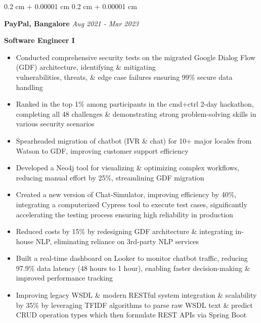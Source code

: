 \documentclass[10pt, letterpaper]{article}
\newenvironment{highlights}{
    \begin{itemize}[
        topsep=0.10 cm,
        parsep=0.10 cm,
        partopsep=0pt,
        itemsep=0pt,
        leftmargin=0.4 cm
    ]
}{
    \end{itemize}
} %
\newenvironment{onecolentry}{
    \begin{adjustwidth}{
        0.2 cm + 0.00001 cm
    }{
        0.2 cm + 0.00001 cm
    }
}{
    \end{adjustwidth}
} %
\begin{document}
        \vspace{0.2 cm}

        
        \begin{onecolentry}
        \fontsize{11 pt}{11 pt}
        \textbf{PayPal, Bangalore} \hfill \textit{Aug 2021 - Mar 2023}

            \fontsize{11 pt}{11 pt}
            \textbf{Software Engineer I}
            \begin{highlights}
                \item	Conducted comprehensive security tests on the migrated Google Dialog Flow (GDF) architecture, identifying \& mitigating \\ vulnerabilities, threats, \& edge case failures ensuring 99\% secure data handling
                
                \item	Ranked in the top 1\% among participants in the cmd+ctrl 2-day hackathon, completing all 48 challenges \& demonstrating strong problem-solving skills in various security scenarios
                
                \item	Spearheaded migration of chatbot (IVR \& chat) for 10+ major locales from Watson to GDF, improving customer support efficiency
                
                \item	Developed a Neo4j tool for visualizing \& optimizing complex workflows, reducing manual effort by 25\%, streamlining GDF migration
                
                \item	Created a new version of Chat-Simulator, improving efficiency by 40\%, integrating a computerized Cypress tool to execute test cases, significantly accelerating the testing process ensuring high reliability in production
                
                \item	Reduced costs by 15\% by redesigning GDF architecture \& integrating in-house NLP, eliminating reliance on 3rd-party NLP services
                
                \item	Built a real-time dashboard on Looker to monitor chatbot traffic, reducing 97.9\% data latency (48 hours to 1 hour), enabling faster decision-making \& improved performance tracking
                
                \item	Improving legacy WSDL \& modern RESTful system integration \& scalability by 35\% by leveraging TFIDF algorithms to parse raw WSDL text \& predict CRUD operation types which then formulate REST APIs via Spring Boot
                



            \end{highlights}
        \end{onecolentry}
\end{document}
